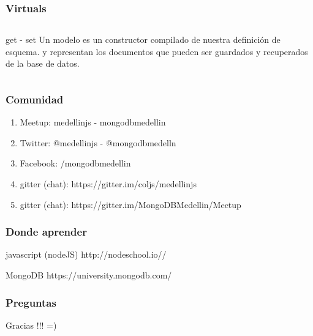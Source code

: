 \documentclass{beamer}
\begin{document}
\begin{frame}
\frametitle{Virtuals}
\begin{columns}[c]
get - set
Un modelo es un constructor compilado de nuestra definici\'on de esquema.
y representan los documentos que pueden ser guardados y recuperados de la base de datos.
\end{columns}
\end{frame}

\begin{frame}
\frametitle{Comunidad}
\begin{enumerate}
\item Meetup: medellinjs  - mongodbmedellin
\pause
\item Twitter: @medellinjs - @mongodbmedelln
\pause
\item Facebook: /mongodbmedellin
\pause
\item gitter (chat): https://gitter.im/coljs/medellinjs
\pause
\item gitter (chat): https://gitter.im/MongoDBMedellin/Meetup
\end{enumerate}
\end{frame}
\begin{frame}
\frametitle{Donde aprender}
\footnotesize{
\begin{thebibliography}{99} %
 javascript (nodeJS)
\newblock http://nodeschool.io//
\end{thebibliography}
}

\footnotesize{
\begin{thebibliography}{99} %
 MongoDB
\newblock https://university.mongodb.com/
\end{thebibliography}
}
\end{frame}

\begin{frame}
\frametitle{Preguntas}
\end{frame}

\begin{frame}
\Huge{\centerline{Gracias !!! =)}}
\end{frame}
\end{document}

